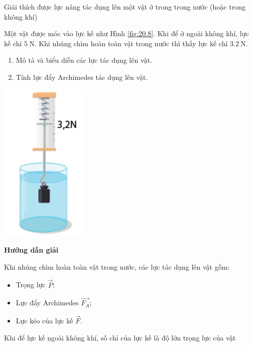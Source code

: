 \begin{dang}{Giải thích được lực nâng tác dụng lên một vật ở trong trong nước (hoặc trong không khí)}
	{\begin{minipage}[l]{0.6\textwidth}
			Một vật được móc vào lực kế như Hình \ref{fig:20.8}. Khi để ở ngoài không khí, lực kế chỉ $\SI{5}{\newton}$. Khi nhúng chìm hoàn toàn vật trong nước thì thấy lực kế chỉ $\SI{3.2}{\newton}$.
			\begin{enumerate}[label=\alph*)]
				\item Mô tả và biểu diễn các lực tác dụng lên vật.
				\item Tính lực đẩy Archimedes tác dụng lên vật.
			\end{enumerate}
		\end{minipage}
		\begin{minipage}{0.4\textwidth}
			\begin{center}
				\includegraphics[width=0.25\linewidth]{../figs/VN10-2023-PH-TP020-8}
				\label{fig:20.8}
			\end{center}
		\end{minipage}
}
{\begin{center}
		\textbf{Hướng dẫn giải}
	\end{center}
\begin{enumerate}[label=\alph*)]
	\begin{minipage}[l]{0.5\textwidth}
		\item Khi nhúng chìm hoàn toàn vật trong nước, các lực tác dụng lên vật gồm:
		\begin{itemize}
			\item Trọng lực $\vec{P}$;
			\item Lực đẩy Archimedes $\overrightarrow{F_A}$;
			\item Lực kéo của lực kế $\vec{F}$.
		\end{itemize}
	\item Khi để lực kế ngoài không khí, số chỉ của lực kế là độ lớn trọng lực của vật

\end{minipage}
\end{enumerate}}
\end{dang}
